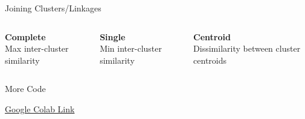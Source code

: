 \documentclass{beamer}
\begin{document}
\begin{frame}{Joining Clusters/Linkages}
\begin{columns}[T]
  \begin{column}{0.33\textwidth}
  \textbf{Complete}\\
  Max inter-cluster similarity
  \end{column}
  \begin{column}{0.33\textwidth}
  \textbf{Single} \\
  Min inter-cluster similarity
  \end{column}
  \begin{column}{0.33\textwidth}
  \textbf{Centroid} \\
  Dissimilarity between cluster centroids 
  \end{column}
\end{columns}

\end{frame}

\begin{frame}{More Code}
\begin{center}
\href{https://colab.research.google.com/drive/1HMPn0mpMAe4XFe5Zvh4oExgi5evkgjTi}{Google Colab Link}
\end{center}
\end{frame}
\end{document}
